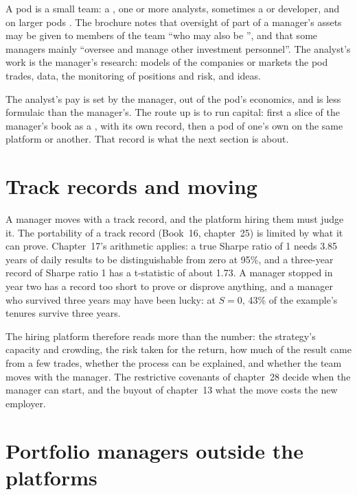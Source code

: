 A pod is a small team: a , one or more analysts, sometimes a  or developer, and on
larger pods . The brochure notes that oversight of part of a manager's assets may be given to
members of the team ``who may also be \textquotedbl {}\textquotedbl'', and that some managers mainly
``oversee and manage other investment personnel''. The analyst's work is the manager's research: models of the companies
or markets the pod trades, data, the monitoring of positions and risk, and ideas.

The analyst's pay is set by the manager, out of the pod's economics, and is less formulaic than the manager's. The
route up is to run capital: first a slice of the manager's book as a , with its own record, then a
pod of one's own on the same platform or another. That record is what the next section is about.

\section{Track records and moving}

A manager moves with a track record, and the platform hiring them must judge it. The portability of a track record
(Book~16, chapter~25) is limited by what it can prove. Chapter~17's arithmetic applies: a true Sharpe ratio of 1 needs
3.85 years of daily results to be distinguishable from zero at 95\%, and a three-year record of Sharpe ratio 1 has a
t-statistic of about 1.73. A manager stopped in year two has a record too short to prove or disprove anything, and a
manager who survived three years may have been lucky: at $S=0$, 43\% of the example's tenures survive three years.

The hiring platform therefore reads more than the number: the strategy's capacity and crowding, the risk taken for the
return, how much of the result came from a few trades, whether the process can be explained, and whether the team moves
with the manager. The restrictive covenants of chapter~28 decide when the manager can start, and the buyout of chapter~13
what the move costs the new employer.

\section{Portfolio managers outside the platforms}

